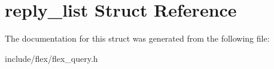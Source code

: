 \hypertarget{structreply__list}{}\section{reply\+\_\+list Struct Reference}
\label{structreply__list}


The documentation for this struct was generated from the following file\+:\begin{DoxyCompactItemize}
\item 
include/flex/flex\+\_\+query.\+h\end{DoxyCompactItemize}
